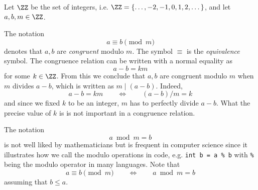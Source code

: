 \documentclass{practice}
\begin{document}
Let $\ZZ$ be the set of integers, i.e. $\ZZ = \{\dots, -2, -1, 0, 1, 2, \dots\}$, and let $a, b, m \in \ZZ$.

The notation
\[
  a \equiv b \pmod{m}
\]
denotes that $a,b$ are \emph{congruent} modulo $m$.
The symbol $\equiv$ is the \emph{equivalence} symbol.
The congruence relation can be written with a normal equality as
\[
  a - b = km
\]
for some $k\in\ZZ$.
From this we conclude that $a,b$ are congruent modulo $m$ when $m$ divides $a - b$, which is written as $m\mid(a-b)$.
Indeed,
\[
  a - b = km \qquad\iff\qquad
  (a-b)/m = k
\]
and since we fixed $k$ to be an integer, $m$ has to perfectly divide $a-b$.
What the precise value of $k$ is is not important in a congruence relation.

The notation
\[
  a \bmod m = b
\]
is not well liked by mathematicians but is frequent in computer science since it illustrates how we call the modulo operations in code, e.g. \texttt{int b = a \% b} with \texttt{\%} being the modulo operator in many languages.
Note that
\[
  a \equiv b \pmod{m} \qquad\iff\qquad
  a \bmod{m} = b
\]
assuming that $b \le a$.
\end{document}
